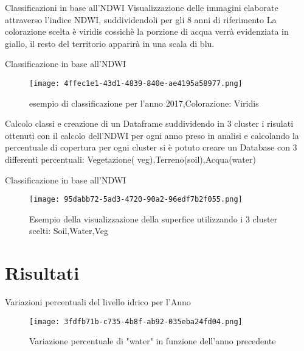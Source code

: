 \documentclass{beamer} %
\begin{document}
 \begin{frame}{Classificazioni in base all'NDWI} 
          Visualizzazione delle immagini elaborate attraverso l'indice NDWI, 
suddividendoli per gli 8 anni di riferimento
La colorazione scelta è viridis cossichè la porzione di acqua verrà evidenziata in giallo, 
il resto del territorio apparirà in una scala di blu. 

        

       \end{frame}
       \begin{frame}{Classificazione in base all'NDWI}
           \begin{figure}
               \centering
               \texttt{[image: 4ffec1e1-43d1-4839-840e-ae4195a58977.png]}
               \caption{ esempio di classificazione per l'anno 2017,Colorazione: Viridis}
               \label{fig:enter-label}
           \end{figure}
       \end{frame}
       \begin{frame}{Calcolo classi e creazione di un Dataframe}
           suddividendo in 3 cluster i risulati ottenuti con il calcolo dell'NDWI per ogni anno preso in analisi e calcolando la percentuale di copertura per ogni cluster si è potuto creare un Database con 3 differenti percentuali: Vegetazione( veg),Terreno(soil),Acqua(water)
       \end{frame}
       \begin{frame}{Classificazione in base all'NDWI}
           \begin{figure}
               \centering
               \texttt{[image: 95dabb72-5ad3-4720-90a2-96edf7b2f055.png]}
               \caption{Esempio della visualizzazione della superfice utilizzando i 3 cluster scelti: Soil,Water,Veg}
               \label{fig:enter-label}
           \end{figure}
       \end{frame}
\section{Risultati}
        \begin{frame}{Variazioni percentuali del livello idrico per l'Anno }
            \begin{figure}
                \centering
                \texttt{[image: 3fdfb71b-c735-4b8f-ab92-035eba24fd04.png]}
                \caption{Variazione percentuale di "water" in funzione dell'anno precedente}
                \label{fig:enter-label}
            \end{figure}
        \end{frame}
\end{document}
